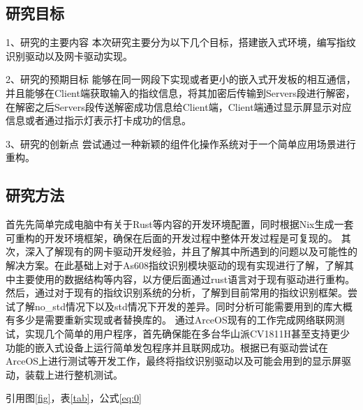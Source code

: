 \subsection{研究目标}

1、研究的主要内容
本次研究主要分为以下几个目标，搭建嵌入式环境，编写指纹识别驱动以及网卡驱动实现。

2、研究的预期目标
能够在同一网段下实现或者更小的嵌入式开发板的相互通信，并且能够在Client端获取输入的指纹信息，将其加密后传输到Servers段进行解密，在解密之后Servers段传送解密成功信息给Client端，Client端通过显示屏显示对应信息或者通过指示灯表示打卡成功的信息。

3、研究的创新点
    尝试通过一种新颖的组件化操作系统对于一个简单应用场景进行重构。

\subsection{研究方法}

首先先简单完成电脑中有关于Rust等内容的开发环境配置，同时根据Nix生成一套可重构的开发环境框架，确保在后面的开发过程中整体开发过程是可复现的。
其次，深入了解现有的网卡驱动开发经验，并且了解其中所遇到的问题以及可能性的解决方案。在此基础上对于As608指纹识别模块驱动的现有实现进行了解，了解其中主要使用的数据结构等内容，以方便后面通过rust语言对于现有驱动进行重构。
然后，通过对于现有的指纹识别系统的分析，了解到目前常用的指纹识别框架。尝试了解no\_std情况下以及std情况下开发的差异。同时分析可能需要用到的库大概有多少是需要重新实现或者替换库的。
通过ArceOS现有的工作完成网络联网测试，实现几个简单的用户程序，首先确保能在多台华山派CV1811H甚至支持更少功能的嵌入式设备上运行简单发包程序并且联网成功。根据已有驱动尝试在ArceOS上进行测试等开发工作，最终将指纹识别驱动以及可能会用到的显示屏驱动，装载上进行整机测试。

引用图\ref{fig}，表\ref{tab}，公式\eqref{eq:0}
